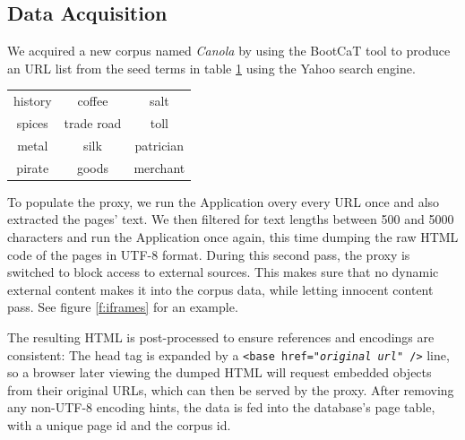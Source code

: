 \subsection{Data Acquisition\label{datagather}}

We acquired a new corpus named \textit{Canola} by using the BootCaT \cite{bootcat} tool to produce an URL list from the seed terms in table \ref{t:seed} using the Yahoo search engine. 

\begin{table}
\label{t:seed}
\centering
{}
\begin{tabular}[h]{ccc}
        history
&        coffee 
&        salt \\
        spices 
&        trade road
&        toll \\
        metal
&        silk 
&        patrician \\
        pirate 
&        goods
&        merchant 
\end{tabular}
\end{table}


To populate the proxy, we run the Application overy every URL once and also extracted the pages' text.
We then filtered for text lengths between 500 and 5000 characters and run the Application once again, this time dumping the raw HTML code of the pages in UTF-8 format.
During this second pass, the proxy is switched to block access to external sources.
This makes sure that no dynamic external content makes it into the corpus data, while letting innocent content pass.
See figure \ref{f:iframes} for an example.


The resulting HTML is post-processed to ensure references and encodings are consistent:
The head tag is expanded by a \texttt{<base href="\textit{original url}" />} line, so a browser later viewing the dumped HTML will request embedded objects from their original URLs, which can then be served by the proxy.
After removing any non-UTF-8 encoding hints, the data is fed into the database's page table, with a unique page id and the corpus id.

